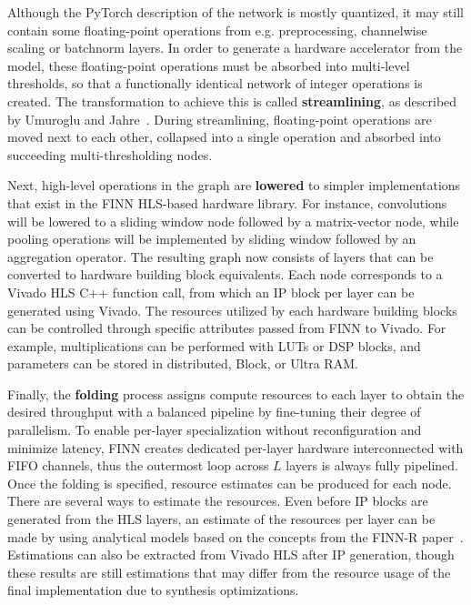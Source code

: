 Although the PyTorch description of the network is mostly quantized, it may still contain some floating-point operations from e.g. preprocessing, channelwise scaling or batchnorm layers. In order to generate a hardware accelerator from the model, these floating-point operations must be absorbed into multi-level thresholds, so that a functionally identical network of integer operations is created. The transformation to achieve this is called \textbf{streamlining}, as described by Umuroglu and Jahre~\cite{DBLP:journals/corr/abs-1709-04060}. During streamlining, floating-point operations are moved next to each other, collapsed into a single operation and absorbed into succeeding multi-thresholding nodes.

Next, high-level operations in the graph are \textbf{lowered} to simpler implementations that exist in the FINN HLS-based hardware library. For instance, convolutions will be lowered to a sliding window node followed by a matrix-vector node, while pooling operations will be implemented by sliding window followed by an aggregation operator. The resulting graph now consists of layers that can be converted to hardware building block equivalents. Each node corresponds to a Vivado HLS C++ function call, from which an IP block per layer can be generated using Vivado. The resources utilized by each hardware building blocks can be controlled through specific attributes passed from FINN to Vivado. For example, multiplications can be performed with LUTs or DSP blocks, and parameters can be stored in distributed, Block, or Ultra RAM.

Finally, the \textbf{folding} process assigns compute resources to each layer to obtain the desired throughput with a balanced pipeline by fine-tuning their degree of parallelism. 
To enable per-layer specialization without reconfiguration and minimize latency, FINN creates dedicated per-layer hardware interconnected with FIFO channels, thus the outermost loop across $L$ layers is always fully pipelined.
Once the folding is specified, resource estimates can be produced for each node. 
There are several ways to estimate the resources. Even before IP blocks are generated from the HLS layers, an estimate of the resources per layer can be made by using analytical models based on the concepts from the FINN-R paper~\cite{blott2018finnr}. 
Estimations can also be extracted from Vivado HLS after IP generation, though these results are still estimations that may differ from the resource usage of the final implementation due to synthesis optimizations.

